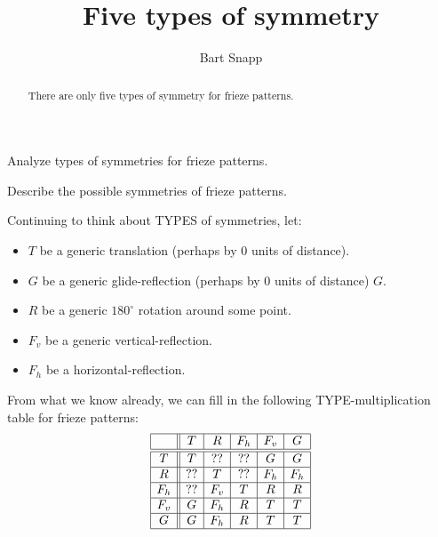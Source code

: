 \documentclass[noauthor,nooutcomes,hints,handout]{ximera}
\author{Bart Snapp}
\title{Five types of symmetry}
\begin{document}
\begin{abstract}
  There are only five types of symmetry for frieze patterns.
\end{abstract}
\maketitle

\begin{listOutcomes}
\item Analyze types of symmetries for frieze patterns.
\item Describe the possible symmetries of frieze patterns.
\end{listOutcomes}

Continuing to think about TYPES of symmetries, let:
\begin{itemize}
  \item $T$ be a generic translation (perhaps by $0$ units of
    distance).
  \item $G$ be a generic glide-reflection (perhaps by $0$ units of
    distance) $G$.
  \item $R$ be a generic $180^\circ$ rotation around some point.
  \item $F_v$ be a generic vertical-reflection.
  \item $F_h$ be a horizontal-reflection. 
\end{itemize}
From what we know already, we can fill in the following
TYPE-multiplication table for frieze patterns:
\[
\begin{array}{|c||c|c|c|c|c|}
    \hline
        & T    & R    & F_h   & F_v & G     \\ \hline\hline
    T   & T    & ??   & ??    & G   & G     \\ \hline
    R   & ??   & T    & ??    & F_h & F_h   \\ \hline
    F_h & ??   & F_v  & T     & R   & R   \\ \hline
    F_v & G    & F_h  & R     & T   & T   \\ \hline
    G   & G    & F_h  & R     & T   & T   \\ \hline
\end{array}
\]




\mynewpage
\end{document}
